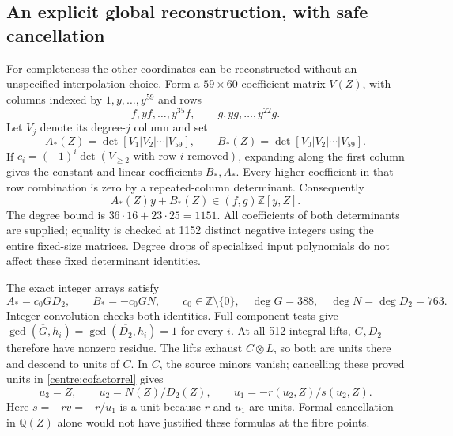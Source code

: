 \documentclass[11pt,a4paper]{article}
\theoremstyle{remark}\newtheorem{remark}[theorem]{Remark}
\begin{document}
\subsection{An explicit global reconstruction, with safe cancellation}
For completeness the other coordinates can be reconstructed without
an unspecified interpolation choice. Form a $59\times60$ coefficient
matrix $V(Z)$, with columns indexed by $1,y,\ldots,y^{59}$ and rows
\[
 f,yf,\ldots,y^{35}f,\qquad g,yg,\ldots,y^{22}g.
\]
Let $V_j$ denote its degree-$j$ column and set
\[
 A_*(Z)=\det[V_1|V_2|\cdots|V_{59}],\qquad
 B_*(Z)=\det[V_0|V_2|\cdots|V_{59}].
\]
If $c_i=(-1)^i\det(V_{\ge2}\text{ with row }i\text{ removed})$,
expanding along the first column gives the constant and linear
coefficients $B_*,A_*$. Every higher coefficient in that row
combination is zero by a repeated-column determinant. Consequently
\begin{equation}\label{centre:cofactorrel}
 A_*(Z)y+B_*(Z)\in(f,g)\mathbb Z[y,Z].
\end{equation}
The degree bound is $36\cdot16+23\cdot25=1151$. All coefficients of
both determinants are supplied; equality is checked at 1152 distinct
negative integers using the entire fixed-size matrices. Degree drops
of specialized input polynomials do not affect these fixed
determinant identities.

The exact integer arrays satisfy
\[
 A_*=c_0GD_2,\qquad B_*=-c_0GN,
 \qquad c_0\in\mathbb Z\setminus\{0\},
 \quad \deg G=388,\quad\deg N=\deg D_2=763.
\]
Integer convolution checks both identities. Full component tests give
$\gcd(\overline G,h_i)=\gcd(\overline {D_2},h_i)=1$ for every $i$.
At all 512 integral lifts, $G,D_2$ therefore have nonzero residue.
The lifts exhaust $C\otimes L$, so both are units there and descend
to units of $C$. In $C$, the source minors vanish; cancelling these
proved units in \eqref{centre:cofactorrel} gives
\[
 u_3=Z,\qquad u_2=N(Z)/D_2(Z),\qquad
 u_1=-r(u_2,Z)/s(u_2,Z).
\]
Here $s=-rv=-r/u_1$ is a unit because $r$ and $u_1$ are units.
Formal cancellation in $\mathbb Q(Z)$ alone would not have justified
these formulas at the fibre points.
\end{document}
